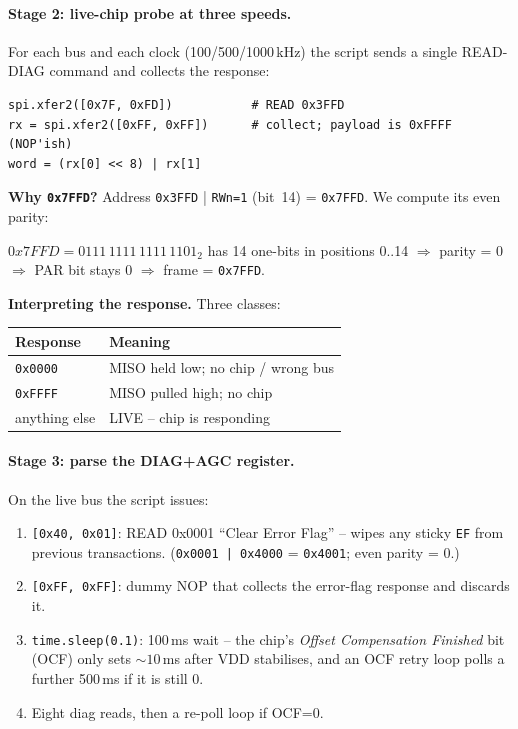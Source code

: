 \documentclass[11pt,a4paper]{article}
\begin{document}
\paragraph{Stage 2: live-chip probe at three speeds.}
For each bus and each clock (100/500/1000\,kHz) the script sends a
single READ-DIAG command and collects the response:
\begin{lstlisting}
spi.xfer2([0x7F, 0xFD])           # READ 0x3FFD
rx = spi.xfer2([0xFF, 0xFF])      # collect; payload is 0xFFFF (NOP'ish)
word = (rx[0] << 8) | rx[1]
\end{lstlisting}
\textbf{Why \texttt{0x7FFD}?}
Address \texttt{0x3FFD} | \texttt{RWn=1} (bit~14) = \texttt{0x7FFD}.  We
compute its even parity:
\begin{center}\small
\(0x7FFD = 0111\,1111\,1111\,1101_2\) has 14 one-bits in positions
0..14 $\Rightarrow$ parity = 0 $\Rightarrow$ PAR bit stays 0
$\Rightarrow$ frame = \texttt{0x7FFD}.
\end{center}
\textbf{Interpreting the response.}  Three classes:
\begin{center}\small
\begin{tabular}{ll}
\toprule
Response & Meaning \\
\midrule
\texttt{0x0000} & MISO held low; no chip / wrong bus \\
\texttt{0xFFFF} & MISO pulled high; no chip \\
anything else   & LIVE -- chip is responding \\
\bottomrule
\end{tabular}
\end{center}

\paragraph{Stage 3: parse the DIAG+AGC register.}
On the live bus the script issues:
\begin{enumerate}
  \item \texttt{[0x40, 0x01]}: READ 0x0001 ``Clear Error Flag'' --
        wipes any sticky \texttt{EF} from previous transactions.
        (\texttt{0x0001 | 0x4000} = \texttt{0x4001}; even parity = 0.)
  \item \texttt{[0xFF, 0xFF]}: dummy NOP that collects the error-flag
        response and discards it.
  \item \texttt{time.sleep(0.1)}: 100\,ms wait -- the chip's
        \emph{Offset Compensation Finished} bit (OCF) only sets ${\sim}10\,$ms
        after VDD stabilises, and an OCF retry loop polls a further
        500\,ms if it is still 0.
  \item Eight diag reads, then a re-poll loop if OCF=0.
\end{enumerate}
\end{document}
